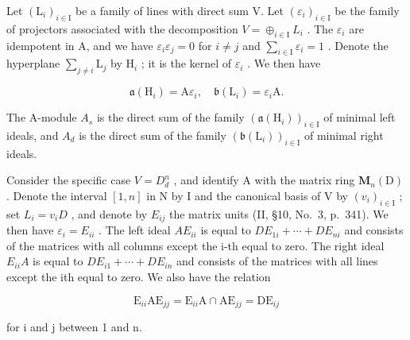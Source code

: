 Let \((\mathrm{L}_{i})_{i\in\mathrm{I}}\) be a family of lines with direct sum V. Let \((\varepsilon_{i})_{i\in\mathrm{I}}\) be the family of projectors associated with the decomposition \(V=\oplus_{i\in\mathrm{I}}L_{i}\) . The \(\varepsilon_{i}\) are idempotent in A, and we have \(\varepsilon_{i}\varepsilon_{j} = 0\) for \(i\neq j\) and \(\sum_{i\in \mathrm{I}}\varepsilon_i = 1\) . Denote the hyperplane \(\sum_{j\neq i}\mathrm{L}_j\) by \(\mathrm{H}_i\) ; it is the kernel of \(\varepsilon_{i}\) . We then have

\[
\mathfrak {a} (\mathrm{H} _ {i}) = \mathrm{A}   \varepsilon_ {i}  , \quad \mathfrak {b} (\mathrm{L} _ {i}) = \varepsilon_ {i}   \mathrm{A}  .
\]

The A-module \(A_{s}\) is the direct sum of the family \((\mathfrak{a}(\mathrm{H}_{i}))_{i\in\mathrm{I}}\) of minimal left ideals, and \(A_{d}\) is the direct sum of the family \((\mathfrak{b}(\mathrm{L}_{i}))_{i\in\mathrm{I}}\) of minimal right ideals.

Consider the specific case \(V = D_{d}^{n}\) , and identify A with the matrix ring \(\mathbf{M}_{n}(\mathrm{D})\) . Denote the interval \([1, n]\) in N by I and the canonical basis of V by \((v_{i})_{i \in \mathrm{I}}\) ; set \(L_{i} = v_{i}D\) , and denote by \(E_{ij}\) the matrix units (II, §10, No.~3, p.~341). We then have \(\varepsilon_{i} = E_{ii}\) . The left ideal \(AE_{ii}\) is equal to \(DE_{1i} + \cdots + DE_{ni}\) and consists of the matrices with all columns except the i-th equal to zero. The right ideal \(E_{ii}A\) is equal to \(DE_{i1} + \cdots + DE_{in}\) and consists of the matrices with all lines except the ith equal to zero. We also have the relation

\[
\mathrm{E} _ {i i} \mathrm{AE} _ {j j} = \mathrm{E} _ {i i} \mathrm{A} \cap \mathrm{AE} _ {j j} = \mathrm{DE} _ {i j}
\]

for i and j between 1 and n.
